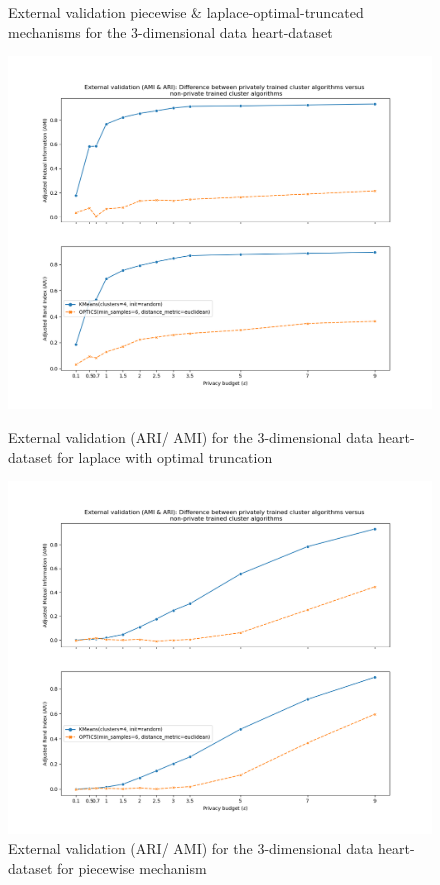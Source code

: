 \begin{figure}[H]
    \caption{External validation piecewise \& laplace-optimal-truncated mechanisms for the 3-dimensional data heart-dataset}
    \centering
    \begin{minipage}[c]{0.49\textwidth}
        \includegraphics[width=1\textwidth]{Results/3d-laplace-optimal-truncated/heart-dataset/ami-and-ari.png}
        \caption{External validation (ARI/ AMI) for the 3-dimensional data heart-dataset for laplace with optimal truncation}
        \label{fig:external-validation-heart-dataset_comparison_3d-laplace}
    \end{minipage}
    \begin{minipage}[c]{0.49\textwidth}
        \includegraphics[width=1\textwidth]{Results/3d-piecewise/heart-dataset/ami-and-ari.png}
        \caption{External validation (ARI/ AMI) for the 3-dimensional data heart-dataset for piecewise mechanism}
        \label{fig:external-validation-heart-dataset_comparison_3d-piecewise}
    \end{minipage}
\end{figure}
